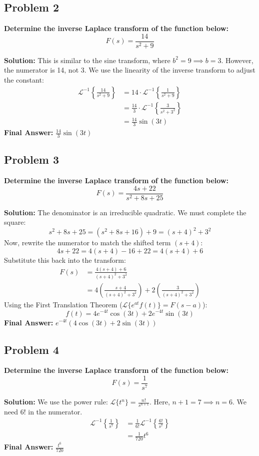 \documentclass[11pt, a4paper]{article}
\theoremstyle{definition}
\theoremstyle{remark}
\newcommand{\Laplace}{\mathcal{L}}
\newcommand{\InvLaplace}{\mathcal{L}^{-1}}
\begin{document}
\subsection*{Problem 2}
\textbf{Determine the inverse Laplace transform of the function below:}
\[ F(s) = \frac{14}{s^2 + 9} \]

\textbf{Solution:}
This is similar to the sine transform, where $b^2 = 9 \implies b = 3$. However, the numerator is 14, not 3. We use the linearity of the inverse transform to adjust the constant:
\begin{align*}
    \InvLaplace\left\{ \frac{14}{s^2 + 9} \right\} &= 14 \cdot \InvLaplace\left\{ \frac{1}{s^2 + 9} \right\} \\
    &= \frac{14}{3} \cdot \InvLaplace\left\{ \frac{3}{s^2 + 3^2} \right\} \\
    &= \frac{14}{3} \sin(3t)
\end{align*}
\textbf{Final Answer:} $\frac{14}{3} \sin(3t)$

\subsection*{Problem 3}
\textbf{Determine the inverse Laplace transform of the function below:}
\[ F(s) = \frac{4s + 22}{s^2 + 8s + 25} \]

\textbf{Solution:}
The denominator is an irreducible quadratic. We must complete the square:
\[ s^2 + 8s + 25 = (s^2 + 8s + 16) + 9 = (s+4)^2 + 3^2 \]
Now, rewrite the numerator to match the shifted term $(s+4)$:
\[ 4s + 22 = 4(s+4) - 16 + 22 = 4(s+4) + 6 \]
Substitute this back into the transform:
\begin{align*}
    F(s) &= \frac{4(s+4) + 6}{(s+4)^2 + 3^2} \\
    &= 4 \left( \frac{s+4}{(s+4)^2 + 3^2} \right) + 2 \left( \frac{3}{(s+4)^2 + 3^2} \right)
\end{align*}
Using the First Translation Theorem ($\Laplace\{e^{at}f(t)\} = F(s-a)$):
\[ f(t) = 4e^{-4t}\cos(3t) + 2e^{-4t}\sin(3t) \]
\textbf{Final Answer:} $e^{-4t}(4\cos(3t) + 2\sin(3t))$

\subsection*{Problem 4}
\textbf{Determine the inverse Laplace transform of the function below:}
\[ F(s) = \frac{1}{s^7} \]

\textbf{Solution:}
We use the power rule: $\Laplace\{t^n\} = \frac{n!}{s^{n+1}}$.
Here, $n+1 = 7 \implies n = 6$. We need $6!$ in the numerator.
\begin{align*}
    \InvLaplace\left\{ \frac{1}{s^7} \right\} &= \frac{1}{6!} \InvLaplace\left\{ \frac{6!}{s^7} \right\} \\
    &= \frac{1}{720} t^6
\end{align*}
\textbf{Final Answer:} $\frac{t^6}{720}$
\end{document}
